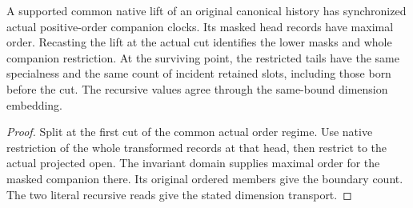 \begin{theorem}
\label{hir:g1-actual-positive-order-companion-lift}
\leanok
A supported common native lift of an original canonical history
has synchronized actual positive-order companion clocks. Its
masked head records have maximal order. Recasting the lift at
the actual cut identifies the lower masks and whole companion
restriction. At the surviving point, the restricted tails have
the same specialness and the same count of incident retained
slots, including those born before the cut. The recursive values
agree through the same-bound dimension embedding.
\end{theorem}
\begin{proof}
Split at the first cut of the common actual order regime.
Use native restriction of the whole transformed records at that
head, then restrict to the actual projected open. The invariant
domain supplies maximal order for the masked companion there.
Its original ordered members give the boundary count. The two
literal recursive reads give the stated dimension transport.
\end{proof}

